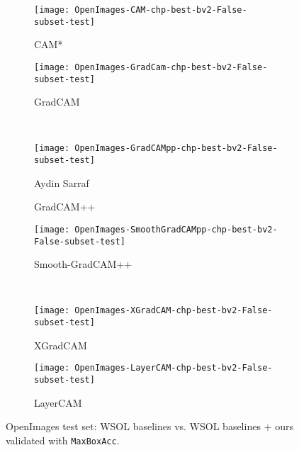 \documentclass[twocolumn]{article}
\newcommand\maxboxacc{\texttt{MaxBoxAcc}\xspace}
\theoremstyle{definition}
\begin{document}
\begin{figure*}
     \centering
     \begin{subfigure}[b]{0.49\textwidth}
         \centering
         \texttt{[image: OpenImages-CAM-chp-best-bv2-False-subset-test]}
         \caption{CAM*}
         \label{fig:opim-06}
     \end{subfigure}
     \hfill
     \begin{subfigure}[b]{0.49\textwidth}
         \centering
         \texttt{[image: OpenImages-GradCam-chp-best-bv2-False-subset-test]}
         \caption{GradCAM}
         \label{fig:opim-05}
     \end{subfigure}
     \\
     \begin{subfigure}[b]{0.49\textwidth}
         \centering
         \texttt{[image: OpenImages-GradCAMpp-chp-best-bv2-False-subset-test]}
         \caption{GradCAM++}
         \label{fig:opim-04}Aydin Sarraf
     \end{subfigure}
     \begin{subfigure}[b]{0.49\textwidth}
         \centering
         \texttt{[image: OpenImages-SmoothGradCAMpp-chp-best-bv2-False-subset-test]}
         \caption{Smooth-GradCAM++}
         \label{fig:opim-03}
     \end{subfigure}
     \\
     \begin{subfigure}[b]{0.49\textwidth}
         \centering
         \texttt{[image: OpenImages-XGradCAM-chp-best-bv2-False-subset-test]}
         \caption{XGradCAM}
         \label{fig:opim-02}
     \end{subfigure}
     \hfill
     \begin{subfigure}[b]{0.49\textwidth}
         \centering
         \texttt{[image: OpenImages-LayerCAM-chp-best-bv2-False-subset-test]}
         \caption{LayerCAM}
         \label{fig:opim-01}
     \end{subfigure}
        \caption{OpenImages test set: WSOL baselines vs. WSOL baselines + ours  validated with \maxboxacc.}
        \label{fig:ours-vs-baselines-perf-openimages}
\end{figure*}
\end{document}
